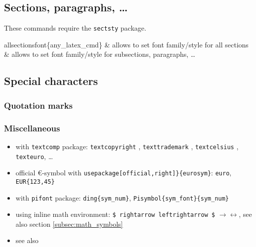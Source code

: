     \subsection{Sections, paragraphs, \dots}
        These commands require the \texttt{sectsty} package.

        \begin{cmdtab}
            \bs allsectionsfont\{any\_latex\_cmd\} & allows to set font family/style for all sections \\
             & allows to set font family/style for subsections, paragraphs, \dots \\
        \end{cmdtab}

    \subsection{Special characters}
        \label{subsec:special_characters}

        \subsubsection{Quotation marks}
            \begin{cmdtab}
                
            \end{cmdtab}
        
        \subsubsection{Miscellaneous}
            \begin{itemize}
                \item with \texttt{textcomp} package: \texttt{\bs textcopyright} \textcopyright, \texttt{\bs texttrademark} \texttrademark, \texttt{\bs textcelsius} \textcelsius, \texttt{\bs texteuro}, \dots
                \item official {\euro}-symbol with \texttt{\bs usepackage[official,right]\}\{eurosym\}}: \texttt{\bs euro}, \texttt{\bs EUR\{123,45\}}
                \item with \texttt{pifont} package: \texttt{\bs ding\{sym\_num\}}, \texttt{\bs Pisymbol\{sym\_font\}\{sym\_num\}}
                \item using inline math environment: \texttt{\$ \bs rightarrow \bs leftrightarrow \$} $ \rightarrow \leftrightarrow $, see also section \ref{subsec:math_symbols}
                \item see also 
            \end{itemize}


